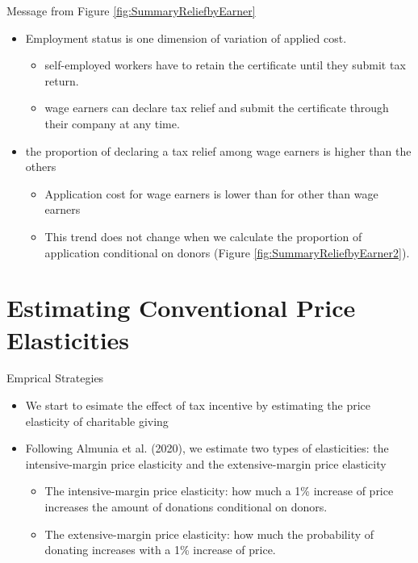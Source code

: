 \documentclass[
  ignorenonframetext,
  aspectratio=169,
]{beamer}
\providecommand{\tightlist}{%
  \setlength{\itemsep}{0pt}\setlength{\parskip}{0pt}}
\begin{document}
\begin{frame}{Message from Figure \ref{fig:SummaryReliefbyEarner}}
\protect\hypertarget{message-from-figure-reffigsummaryreliefbyearner}{}
\begin{itemize}
\tightlist
\item
  Employment status is one dimension of variation of applied cost.

  \begin{itemize}
  \tightlist
  \item
    self-employed workers have to retain the certificate until they submit tax return.
  \item
    wage earners can declare tax relief and submit the certificate through their company at any time.
  \end{itemize}
\item
  the proportion of declaring a tax relief among wage earners is higher than the others

  \begin{itemize}
  \tightlist
  \item
    Application cost for wage earners is lower than for other than wage earners
  \item
    This trend does not change when we calculate the proportion of application conditional on donors (Figure \ref{fig:SummaryReliefbyEarner2}).
  \end{itemize}
\end{itemize}
\end{frame}

\hypertarget{estimating-conventional-price-elasticities}{%
\section{Estimating Conventional Price Elasticities}\label{estimating-conventional-price-elasticities}}

\begin{frame}{Emprical Strategies}
\protect\hypertarget{emprical-strategies}{}
\begin{itemize}
\tightlist
\item
  We start to esimate the effect of tax incentive by estimating the price elasticity of charitable giving
\item
  Following Almunia et al. (2020), we estimate two types of elasticities: the intensive-margin price elasticity and the extensive-margin price elasticity

  \begin{itemize}
  \tightlist
  \item
    The intensive-margin price elasticity: how much a 1\% increase of price increases the amount of donations conditional on donors.
  \item
    The extensive-margin price elasticity: how much the probability of donating increases with a 1\% increase of price.
  \end{itemize}
\end{itemize}
\end{frame}
\end{document}
